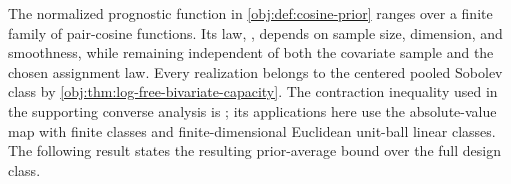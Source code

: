 The normalized prognostic function  in \cref{obj:def:cosine-prior} ranges over a finite family of pair-cosine functions. Its law, , depends on sample size, dimension, and smoothness, while remaining independent of both the covariate sample and the chosen assignment law. Every realization belongs to the centered pooled Sobolev class by \cref{obj:thm:log-free-bivariate-capacity}. The contraction inequality used in the supporting converse analysis is \citet[Theorem~12(4), with Rademacher complexity as in Definition~2]{BartlettMendelson2002Complexities}; its applications here use the absolute-value map with finite classes and finite-dimensional Euclidean unit-ball linear classes. The following result states the resulting prior-average bound over the full design class.

